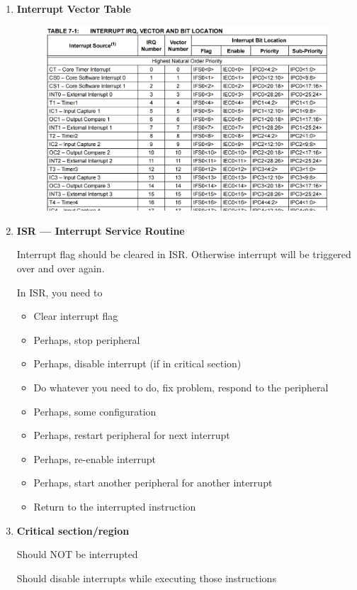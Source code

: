 \documentclass[a4paper]{article}
\begin{document}
\begin{enumerate}[label = \arabic*.]
    \item \textbf{Interrupt Vector Table}
      \begin{figure}[H]
        \centering
        \includegraphics[width=0.9\linewidth]{Interrupt_table.png}
        \label{fig:Interrupt_table.png}
      \end{figure}

    \item \textbf{ISR --- Interrupt Service Routine}
      \par Interrupt flag should be cleared in ISR\@. Otherwise interrupt will be triggered over and over again.

      \par In ISR, you need to
      \begin{itemize}[leftmargin = 1cm]
        \item Clear interrupt flag
        \item Perhaps, stop peripheral
        \item Perhaps, disable interrupt (if in critical section)
        \item Do whatever you need to do, fix problem, respond to the peripheral
        \item Perhaps, some configuration
        \item Perhaps, restart peripheral for next interrupt
        \item Perhaps, re-enable interrupt
        \item Perhaps, start another peripheral for another interrupt
        \item Return to the interrupted instruction
      \end{itemize}

    \item \textbf{Critical section/region}
      \par Should NOT be interrupted
      \par Should disable interrupts while executing those instructions


\end{enumerate}
\end{document}
